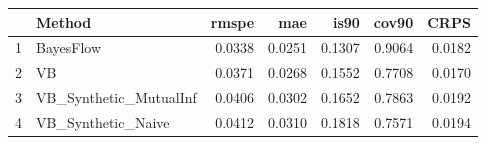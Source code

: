 \documentclass[12pt]{article}
\begin{document}
\thispagestyle{empty}
\begin{table}[ht]
\centering
\begin{tabular}{rlrrrrr}
  \hline
 & Method & rmspe & mae & is90 & cov90 & CRPS \\ 
  \hline
1 & BayesFlow & 0.0338 & 0.0251 & 0.1307 & 0.9064 & 0.0182 \\ 
  2 & VB & 0.0371 & 0.0268 & 0.1552 & 0.7708 & 0.0170 \\ 
  3 & VB\_Synthetic\_MutualInf & 0.0406 & 0.0302 & 0.1652 & 0.7863 & 0.0192 \\ 
  4 & VB\_Synthetic\_Naive & 0.0412 & 0.0310 & 0.1818 & 0.7571 & 0.0194 \\ 
   \hline
\end{tabular}
\end{table}
\end{document}

